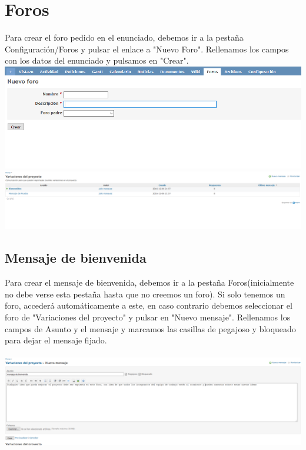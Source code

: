 \documentclass[a4paper,10pt]{scrartcl}
\begin{document}
\section{Foros}

Para crear el foro pedido en el enunciado, debemos ir a la pestaña Configuración/Foros y pulsar el enlace a "Nuevo Foro". Rellenamos los campos con los datos del enunciado y pulsamos en "Crear".\\

\includegraphics[width=\linewidth]{NuevoForo}\\

\includegraphics[width=\linewidth]{Foros}

\subsection{Mensaje de bienvenida}

Para crear el mensaje de bienvenida, debemos ir a la pestaña Foros(inicialmente no debe verse esta pestaña hasta que no creemos un foro). Si solo tenemos un foro, accederá automáticamente a este, en caso contrario debemos seleccionar el foro de "Variaciones del proyecto" y pulsar en "Nuevo mensaje". Rellenamos los campos de Asunto y el mensaje y marcamos las casillas de pegajoso y bloqueado para dejar el mensaje fijado.\\
\\

\includegraphics[width=\linewidth]{NuevoMensaje}
\end{document}
